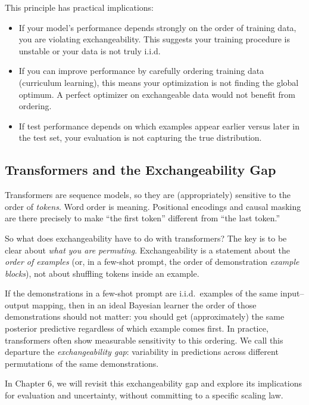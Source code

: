 This principle has practical implications:

\begin{itemize}
\item If your model's performance depends strongly on the order of training data, you are violating exchangeability. This suggests your training procedure is unstable or your data is not truly i.i.d.

\item If you can improve performance by carefully ordering training data (curriculum learning), this means your optimization is not finding the global optimum. A perfect optimizer on exchangeable data would not benefit from ordering.

\item If test performance depends on which examples appear earlier versus later in the test set, your evaluation is not capturing the true distribution.
\end{itemize}

\subsection{Transformers and the Exchangeability Gap}

Transformers are sequence models, so they are (appropriately) sensitive to the order of \emph{tokens}. Word order is meaning. Positional encodings and causal masking are there precisely to make ``the first token'' different from ``the last token.''

So what does exchangeability have to do with transformers? The key is to be clear about \emph{what you are permuting}. Exchangeability is a statement about the \emph{order of examples} (or, in a few-shot prompt, the order of demonstration \emph{example blocks}), not about shuffling tokens inside an example.

If the demonstrations in a few-shot prompt are i.i.d.\ examples of the same input--output mapping, then in an ideal Bayesian learner the order of those demonstrations should not matter: you should get (approximately) the same posterior predictive regardless of which example comes first. In practice, transformers often show measurable sensitivity to this ordering. We call this departure the \emph{exchangeability gap}: variability in predictions across different permutations of the same demonstrations.

In Chapter 6, we will revisit this exchangeability gap and explore its implications for evaluation and uncertainty, without committing to a specific scaling law.

